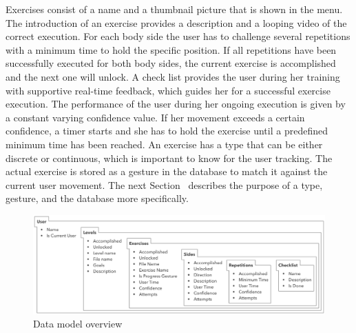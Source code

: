 Exercises consist of a name and a thumbnail picture that is shown in the menu.
The introduction of an exercise provides a description and a looping video of the correct execution.
For each body side the user has to challenge several repetitions with a minimum time to hold the specific position.
If all repetitions have been successfully executed for both body sides, the current exercise is accomplished and the next one will unlock.
A check list provides the user during her training with supportive real-time feedback, which guides her for a successful exercise execution.
The performance of the user during her ongoing execution is given by a constant varying confidence value.
If her movement exceeds a certain confidence, a timer starts and she has to hold the exercise until a predefined minimum time has been reached.
An exercise has a type that can be either discrete or continuous, which is important to know for the user tracking. 
The actual exercise is stored as a gesture in the database to match it against the current user movement.
The next Section~\textit{} describes the purpose of a type, gesture, and the database more specifically.

\begin{figure}[htb]
	\centering
	\begin{minipage}[t]{1\linewidth}
		\centering
		\includegraphics[width=1\linewidth]{Pictures/5_2_dataModel}
		\caption{Data model overview}
		\label{fig:5_2_dataModel}
	\end{minipage}
\end{figure}

